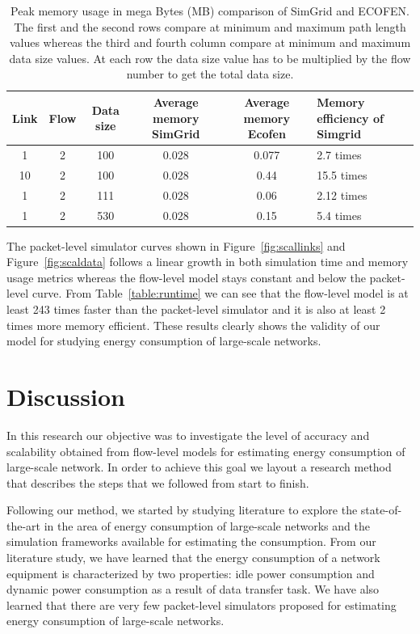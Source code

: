 \begin{table}
		\caption{Peak memory usage in mega Bytes (MB) comparison of SimGrid and ECOFEN. The first and the second rows compare at minimum and maximum path length values whereas the third and fourth column compare at minimum and maximum data size values. At each row the data size value has to be multiplied by the flow number to get the total data size.}
		\label{table:peakmemory}
	\begin{tabular}{cccccl} 
		\toprule
		\textbf{Link} &	\textbf{Flow}&\textbf{Data size} & \textbf{Average memory SimGrid} & \textbf{Average memory Ecofen}& \textbf{Memory efficiency of Simgrid}\\ 
		\midrule
		1&2&100&0.028&0.077&2.7 times \\
		10&2&100&0.028&0.44&15.5 times \\ 
		1&2&111&0.028&0.06&2.12 times \\ 
		1&2&530&0.028&0.15&5.4 times\\ 
		\bottomrule
	\end{tabular} 

\end{table}

The packet-level simulator curves shown in Figure~\ref{fig:scallinks} and Figure~\ref{fig:scaldata} follows a linear growth in both simulation time and memory usage metrics whereas the flow-level model stays constant and below the packet-level curve. From Table~\ref{table:runtime} we can see that the flow-level model is at least 243 times faster than the packet-level simulator and it is also at least 2 times more memory efficient. These results clearly shows the validity of our model for studying energy consumption of large-scale networks.

\section{Discussion}

In this research our objective was to investigate the level of accuracy and scalability obtained from flow-level models for estimating energy consumption of large-scale network. In order to achieve this goal we layout a research method that describes the steps that we followed from start to finish. 

Following our method, we started by studying literature to explore the state-of-the-art in the area of energy consumption of large-scale networks and the simulation frameworks available for estimating the consumption. From our literature study, we have learned that the energy consumption of a network equipment is characterized by two properties: idle power consumption and dynamic power consumption as a result of data transfer task. We have also learned that there are very few packet-level simulators proposed for estimating energy consumption of large-scale networks.

